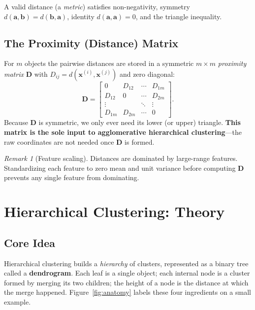 \documentclass[11pt,a4paper]{report}
\theoremstyle{definition}
\theoremstyle{plain}
\theoremstyle{remark}
\newtheorem*{remark}{Remark}
\newcommand{\vx}{\mathbf{x}}
\newcommand{\va}{\mathbf{a}}
\newcommand{\vb}{\mathbf{b}}
\begin{document}
A valid distance (a \emph{metric}) satisfies non-negativity, symmetry
$d(\va,\vb)=d(\vb,\va)$, identity $d(\va,\va)=0$, and the triangle inequality.

\section{The Proximity (Distance) Matrix}
For $m$ objects the pairwise distances are stored in a symmetric
$m\times m$ \emph{proximity matrix} $\mathbf{D}$ with $D_{ij}=d(\vx^{(i)},\vx^{(j)})$
and zero diagonal:
\[
\mathbf{D}=\begin{bmatrix}
0 & D_{12} & \cdots & D_{1m}\\
D_{12} & 0 & \cdots & D_{2m}\\
\vdots & & \ddots & \vdots\\
D_{1m} & D_{2m} & \cdots & 0
\end{bmatrix}.
\]
Because $\mathbf D$ is symmetric, we only ever need its lower (or upper)
triangle. \textbf{This matrix is the sole input to agglomerative hierarchical
clustering}---the raw coordinates are not needed once $\mathbf D$ is formed.

\begin{remark}[Feature scaling]
Distances are dominated by large-range features. Standardizing each feature to
zero mean and unit variance before computing $\mathbf D$ prevents any single
feature from dominating.
\end{remark}

\chapter{Hierarchical Clustering: Theory}
\label{ch:theory}

\section{Core Idea}
Hierarchical clustering builds a \emph{hierarchy} of clusters, represented as a
binary tree called a \textbf{dendrogram}. Each leaf is a single object; each
internal node is a cluster formed by merging its two children; the height of a
node is the distance at which the merge happened.
Figure~\ref{fig:anatomy} labels these four ingredients on a small example.
\end{document}
